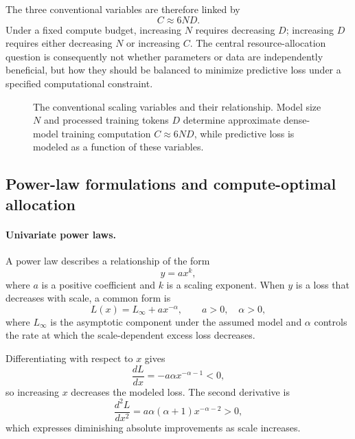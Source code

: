 The three conventional variables are therefore linked by
\begin{equation}
    C\approx 6ND.
    \label{eq:scaling-resource-identity}
\end{equation}
Under a fixed compute budget, increasing \(N\) requires decreasing \(D\);
increasing \(D\) requires either decreasing \(N\) or increasing \(C\). The
central resource-allocation question is consequently not whether parameters
or data are independently beneficial, but how they should be balanced to
minimize predictive loss under a specified computational constraint.

\begin{figure}[htbp]
    \centering
    
    \caption{The conventional scaling variables and their relationship.
    Model size \(N\) and processed training tokens \(D\) determine approximate
    dense-model training computation \(C\approx 6ND\), while predictive loss
    is modeled as a function of these variables.}
    \label{fig:scaling-resource-map}
\end{figure}

\subsection{Power-law formulations and compute-optimal allocation}
\label{subsec:scaling-power-laws}

\paragraph{Univariate power laws.}
A power law describes a relationship of the form
\begin{equation}
    y=ax^k,
    \label{eq:scaling-basic-power-law}
\end{equation}
where \(a\) is a positive coefficient and \(k\) is a scaling exponent. When
\(y\) is a loss that decreases with scale, a common form is
\begin{equation}
    L(x)=L_{\infty}+ax^{-\alpha},
    \qquad a>0,\quad \alpha>0,
    \label{eq:scaling-univariate-loss}
\end{equation}
where \(L_{\infty}\) is the asymptotic component under the assumed model and
\(\alpha\) controls the rate at which the scale-dependent excess loss
decreases.

Differentiating with respect to \(x\) gives
\begin{equation}
    \frac{dL}{dx}
    =
    -a\alpha x^{-\alpha-1}<0,
    \label{eq:scaling-power-first-derivative}
\end{equation}
so increasing \(x\) decreases the modeled loss. The second derivative is
\begin{equation}
    \frac{d^2L}{dx^2}
    =
    a\alpha(\alpha+1)x^{-\alpha-2}>0,
    \label{eq:scaling-power-second-derivative}
\end{equation}
which expresses diminishing absolute improvements as scale increases.

